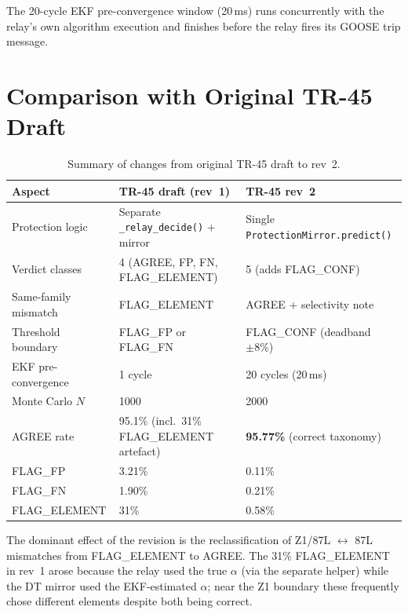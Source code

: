 \documentclass[11pt,a4paper]{article}
\begin{document}
\noindent
The 20-cycle EKF pre-convergence window (20\,ms) runs concurrently with the
relay's own algorithm execution and finishes before the relay fires its GOOSE
trip message.

\section{Comparison with Original TR-45 Draft}
\label{sec:comparison}

\begin{table}[htbp]
  \centering
  \caption{Summary of changes from original TR-45 draft to rev~2.}
  \label{tab:comparison}
  \begin{tabular}{@{}p{4.0cm}p{5.0cm}p{5.0cm}@{}}
    \toprule
    Aspect & TR-45 draft (rev~1) & TR-45 rev~2 \\
    \midrule
    Protection logic     & Separate \texttt{\_relay\_decide()} + mirror
                         & Single \texttt{ProtectionMirror.predict()} \\
    \addlinespace
    Verdict classes      & 4 (AGREE, FP, FN, FLAG\_ELEMENT)
                         & 5 (adds FLAG\_CONF) \\
    \addlinespace
    Same-family mismatch & FLAG\_ELEMENT
                         & AGREE + selectivity note \\
    \addlinespace
    Threshold boundary   & FLAG\_FP or FLAG\_FN
                         & FLAG\_CONF (deadband $\pm8\%$) \\
    \addlinespace
    EKF pre-convergence  & 1 cycle
                         & 20 cycles (20\,ms) \\
    \addlinespace
    Monte Carlo $N$      & 1000 & 2000 \\
    \addlinespace
    AGREE rate           & 95.1\% (incl.\ 31\% FLAG\_ELEMENT artefact)
                         & \textbf{95.77\%} (correct taxonomy) \\
    \addlinespace
    FLAG\_FP             & 3.21\% & 0.11\% \\
    FLAG\_FN             & 1.90\% & 0.21\% \\
    FLAG\_ELEMENT        & 31\%   & 0.58\% \\
    \bottomrule
  \end{tabular}
\end{table}

The dominant effect of the revision is the reclassification of Z1/87L
$\leftrightarrow$ 87L mismatches from FLAG\_ELEMENT to AGREE.  The 31\%
FLAG\_ELEMENT in rev~1 arose because the relay used the true $\alpha$ (via the
separate helper) while the DT mirror used the EKF-estimated $\alpha$; near the
Z1 boundary these frequently chose different elements despite both being
correct.
\end{document}
